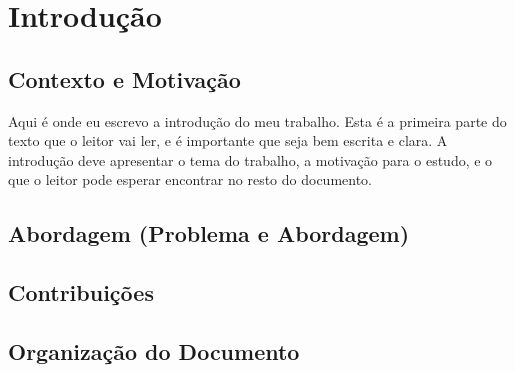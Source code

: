 
%

\chapter{Introdução}
\label{cha:introducao}

\section{Contexto e Motivação}
\label{sec:cont_e_motiv}

Aqui é onde eu escrevo a introdução do meu trabalho.  Esta é a primeira parte do texto que o leitor vai ler, e é importante que seja bem escrita e clara.  A introdução deve apresentar o tema do trabalho, a motivação para o estudo, e o que o leitor pode esperar encontrar no resto do documento.

\section{Abordagem (Problema e Abordagem)}
\label{sec:abordagem}

\section{Contribuições}
\label{sec:contribuicoes}

\section{Organização do Documento}
\label{sec:organizacao}

